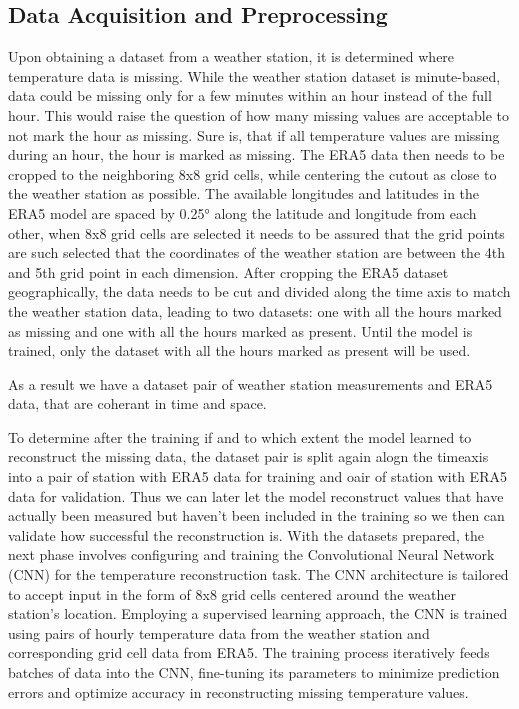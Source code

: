 \subsection{Data Acquisition and Preprocessing}
\label{subsec:data_preprocessing}
Upon obtaining a dataset from a weather station, it is determined where temperature data is missing. While the weather station dataset is minute-based, data could be missing only for a few minutes within an hour instead of the full hour. This would raise the question of how many missing values are acceptable to not mark the hour as missing. Sure is, that if all temperature values are missing during an hour, the hour is marked as missing.
The ERA5 data then needs to be cropped to the neighboring 8x8 grid cells, while centering the cutout as close to the weather station as possible. The available longitudes and latitudes in the ERA5 model are spaced by 0.25° along the latitude and longitude from each other, when 8x8 grid cells are selected it needs to be assured that the grid points are such selected that the coordinates of the weather station are between the 4th and 5th grid point in each dimension. 
After cropping the ERA5 dataset geographically, the data needs to be cut and divided along the time axis to match the weather station data, leading to two datasets: one with all the hours marked as missing and one with all the hours marked as present. Until the model is trained, only the dataset with all the hours marked as present will be used. 

As a result we have a dataset pair of weather station measurements and ERA5 data, that are coherant in time and space.

To determine after the training if and to which extent the model learned to reconstruct the missing data, the dataset pair is split again alogn the timeaxis into a pair of station with ERA5 data for training and oair of station with ERA5 data for validation. Thus we can later let the model reconstruct values that have actually been measured but haven't been included in the training so we then can validate how successful the reconstruction is. With the datasets prepared, the next phase involves configuring and training the Convolutional Neural Network (CNN) for the temperature reconstruction task. The CNN architecture is tailored to accept input in the form of 8x8 grid cells centered around the weather station's location. Employing a supervised learning approach, the CNN is trained using pairs of hourly temperature data from the weather station and corresponding grid cell data from ERA5. The training process iteratively feeds batches of data into the CNN, fine-tuning its parameters to minimize prediction errors and optimize accuracy in reconstructing missing temperature values.


